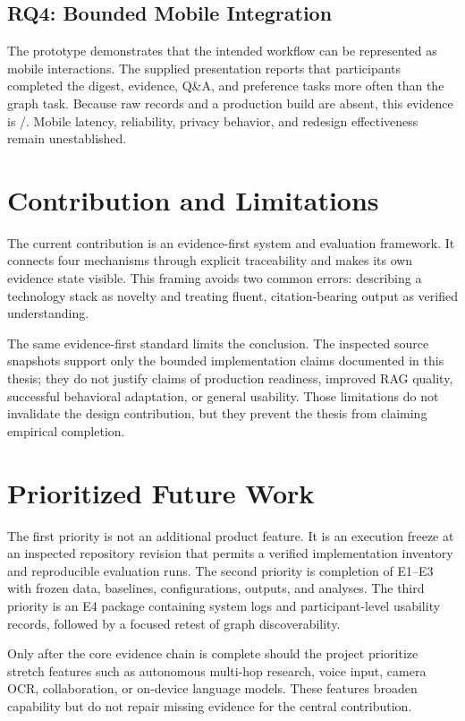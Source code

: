 \subsection{RQ4: Bounded Mobile Integration}

The prototype demonstrates that the intended workflow can be represented as mobile interactions.
The supplied presentation reports that participants completed the digest, evidence, Q\&A, and preference tasks more often than the graph task.
Because raw records and a production build are absent, this evidence is \observed{}/\limited{}.
Mobile latency, reliability, privacy behavior, and redesign effectiveness remain unestablished.

\section{Contribution and Limitations}

The current contribution is an evidence-first system and evaluation framework.
It connects four mechanisms through explicit traceability and makes its own evidence state visible.
This framing avoids two common errors: describing a technology stack as novelty and treating fluent, citation-bearing output as verified understanding.

The same evidence-first standard limits the conclusion.
The inspected source snapshots support only the bounded implementation claims documented in this thesis; they do not justify claims of production readiness, improved RAG quality, successful behavioral adaptation, or general usability.
Those limitations do not invalidate the design contribution, but they prevent the thesis from claiming empirical completion.

\section{Prioritized Future Work}

The first priority is not an additional product feature.
It is an execution freeze at an inspected repository revision that permits a verified implementation inventory and reproducible evaluation runs.
The second priority is completion of E1--E3 with frozen data, baselines, configurations, outputs, and analyses.
The third priority is an E4 package containing system logs and participant-level usability records, followed by a focused retest of graph discoverability.

Only after the core evidence chain is complete should the project prioritize stretch features such as autonomous multi-hop research, voice input, camera OCR, collaboration, or on-device language models.
These features broaden capability but do not repair missing evidence for the central contribution.

